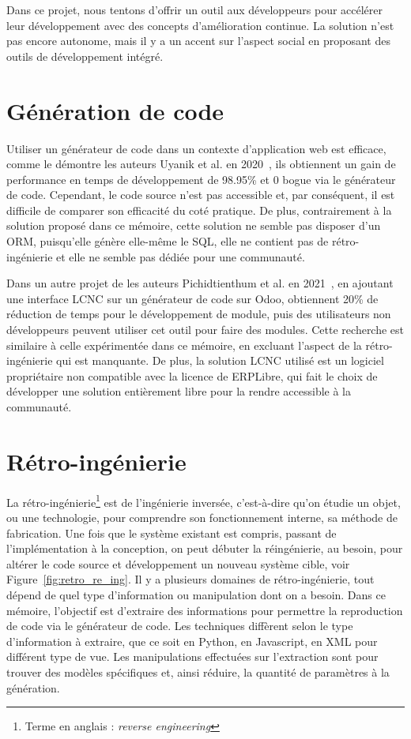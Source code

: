 Dans ce projet, nous tentons d'offrir un outil aux développeurs pour accélérer leur développement avec des concepts d'amélioration continue. La solution n'est pas encore autonome, mais il y a un accent sur l'aspect social en proposant des outils de développement intégré.

\section{Génération de code}

Utiliser un générateur de code dans un contexte d'application web est efficace, comme le démontre les auteurs Uyanik et al. en 2020~\cite{SAHIN2020}, ils obtiennent un gain de performance en temps de développement de 98.95\% et 0 bogue via le générateur de code. Cependant, le code source n'est pas accessible et, par conséquent, il est difficile de comparer son efficacité du coté pratique. De plus, contrairement à la solution proposé dans ce mémoire, cette solution ne semble pas disposer d'un ORM, puisqu'elle génère elle-même le SQL, elle ne contient pas de rétro-ingénierie et elle ne semble pas dédiée pour une communauté. 

Dans un autre projet de les auteurs Pichidtienthum et al. en 2021~\cite{9436754}, en ajoutant une interface LCNC sur un générateur de code sur Odoo, obtiennent 20\% de réduction de temps pour le développement de module, puis des utilisateurs non développeurs peuvent utiliser cet outil pour faire des modules. Cette recherche est similaire à celle expérimentée dans ce mémoire, en excluant l'aspect de la rétro-ingénierie qui est manquante. De plus, la solution LCNC utilisé est un logiciel propriétaire non compatible avec la licence de ERPLibre, qui fait le choix de développer une solution entièrement libre pour la rendre accessible à la communauté.

\section{Rétro-ingénierie}
La rétro-ingénierie\footnote{Terme en anglais : \textit{reverse engineering}} est de l'ingénierie inversée, c'est-à-dire qu'on étudie un objet, ou une technologie, pour comprendre son fonctionnement interne, sa méthode de fabrication. Une fois que le système existant est compris, passant de l'implémentation à la conception, on peut débuter la réingénierie, au besoin, pour altérer le code source et développement un nouveau système cible, voir Figure~\ref{fig:retro_re_ing}. Il y a plusieurs domaines de rétro-ingénierie, tout dépend de quel type d'information ou manipulation dont on a besoin. Dans ce mémoire, l'objectif est d'extraire des informations pour permettre la reproduction de code via le générateur de code. Les techniques diffèrent selon le type d'information à extraire, que ce soit en Python, en Javascript, en XML pour différent type de vue. Les manipulations effectuées sur l'extraction sont pour trouver des modèles spécifiques et, ainsi réduire, la quantité de paramètres à la génération.

